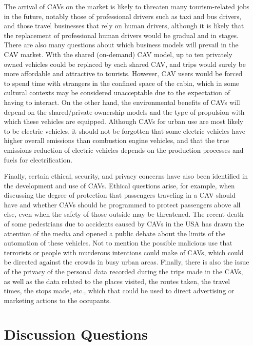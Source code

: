 \documentclass[
  letterpaper,
  DIV=11,
  numbers=noendperiod]{scrreprt}
\begin{document}
The arrival of CAVs on the market is likely to threaten many
tourism-related jobs in the future, notably those of professional
drivers such as taxi and bus drivers, and those travel businesses that
rely on human drivers, although it is likely that the replacement of
professional human drivers would be gradual and in stages. There are
also many questions about which business models will prevail in the CAV
market. With the shared (on-demand) CAV model, up to ten privately owned
vehicles could be replaced by each shared CAV, and trips would surely be
more affordable and attractive to tourists. However, CAV users would be
forced to spend time with strangers in the confined space of the cabin,
which in some cultural contexts may be considered unacceptable due to
the expectation of having to interact. On the other hand, the
environmental benefits of CAVs will depend on the shared/private
ownership models and the type of propulsion with which these vehicles
are equipped. Although CAVs for urban use are most likely to be electric
vehicles, it should not be forgotten that some electric vehicles have
higher overall emissions than combustion engine vehicles, and that the
true emissions reduction of electric vehicles depends on the production
processes and fuels for electrification.

Finally, certain ethical, security, and privacy concerns have also been
identified in the development and use of CAVs. Ethical questions arise,
for example, when discussing the degree of protection that passengers
traveling in a CAV should have and whether CAVs should be programmed to
protect passengers above all else, even when the safety of those outside
may be threatened. The recent death of some pedestrians due to accidents
caused by CAVs in the USA has drawn the attention of the media and
opened a public debate about the limits of the automation of these
vehicles. Not to mention the possible malicious use that terrorists or
people with murderous intentions could make of CAVs, which could be
directed against the crowds in busy urban areas. Finally, there is also
the issue of the privacy of the personal data recorded during the trips
made in the CAVs, as well as the data related to the places visited, the
routes taken, the travel times, the stops made, etc., which that could
be used to direct advertising or marketing actions to the occupants.

\hypertarget{discussion-questions-18}{%
\section{Discussion Questions}\label{discussion-questions-18}}
\end{document}
